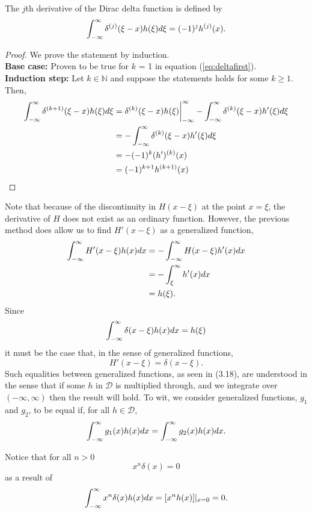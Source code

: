 \begin{theorem} \label{th:deltad}
    The \(j\)th derivative of the Dirac delta function is defined by
    \begin{equation}
         \int_{-\infty}^{\infty} \delta^{(j)}(\xi-x)h(\xi)d\xi = (-1)^jh^{(j)}(x).
    \end{equation}
\end{theorem}
\begin{proof} We prove the statement by induction.\\
    \textbf{Base case:} Proven to be true for \(k\) = 1 in equation (\ref{eq:deltafirst}).\\
    \textbf{Induction step:} Let \(k \in \mathbb{N}\) and suppose the statements holds for some \(k\geq 1\). Then,
    \begin{align*}
        \int_{-\infty}^{\infty} \delta^{(k+1)}(\xi-x)h(\xi)d\xi &= \delta^{(k)}(\xi-x)h(\xi)\biggr\rvert_{-\infty}^{\infty}-\int_{-\infty}^{\infty} \delta^{(k)}(\xi-x)h'(\xi)d\xi\\
        &=-\int_{-\infty}^{\infty} \delta^{(k)}(\xi-x)h'(\xi)d\xi\\
        &=-(-1)^{k}(h')^{(k)}(x)\\
        &=(-1)^{k+1}h^{(k+1)}(x)
    \end{align*}
\end{proof}

Note that because of the discontinuity in \(H(x-\xi)\) at the point \(x=\xi\), the derivative of \(H\) does not exist as an ordinary function. However, the previous method does allow us to find \(H'(x-\xi)\) as a generalized function, 
\begin{equation}
    \begin{split}
        \int_{-\infty}^{\infty} H'(x-\xi)h(x)dx &= -\int_{-\infty}^{\infty} H(x-\xi)h'(x)dx\\
        &=-\int_{\xi}^{\infty}h'(x)dx \\
        &= h(\xi).
    \end{split}
\end{equation}
Since
\begin{equation}
    \int_{-\infty}^{\infty} \delta(x-\xi)h(x)dx=h(\xi)
\end{equation}
it must be the case that, in the sense of generalized functions,
\begin{equation}
    H'(x-\xi) = \delta(x-\xi).
\end{equation}
Such equalities between generalized functions, as seen in (3.18), are understood in the sense that if some \(h\) in \(\mathcal{D}\) is multiplied through, and we integrate over \((-\infty, \infty)\) then the result will hold. To wit, we consider generalized functions, \(g_1\) and \(g_2\), to be equal if, for all \(h\in \mathcal{D}\),
\begin{equation}
    \int_{-\infty}^{\infty} g_1(x)h(x)dx = \int_{-\infty}^{\infty} g_2(x)h(x)dx.
\end{equation}

Notice that for all \(n > 0\)
\begin{equation}
    x^n\delta(x)=0
\end{equation}
as a result of
\begin{equation}
    \int_{-\infty}^{\infty} x^n\delta(x)h(x)dx=[x^nh(x)]|_{x=0} = 0.
\end{equation}



